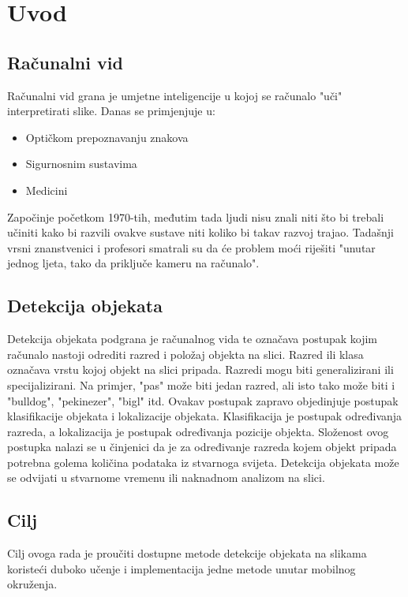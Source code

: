 \chapter{Uvod}
\section{Računalni vid}
Računalni vid grana je umjetne inteligencije u kojoj se računalo "uči" interpretirati slike. 
Danas se primjenjuje u:
\begin{itemize}
    \item Optičkom prepoznavanju znakova
    \item Sigurnosnim sustavima
    \item Medicini
\end{itemize}
Započinje početkom 1970-tih, međutim tada ljudi nisu znali niti što bi trebali učiniti kako bi razvili ovakve sustave niti koliko
bi takav razvoj trajao. Tadašnji vrsni znanstvenici i profesori smatrali su da će problem moći riješiti "unutar jednog ljeta, tako da priključe kameru na računalo". \citep{szeliski2010computer}

\section{Detekcija objekata}
Detekcija objekata podgrana je računalnog vida te označava postupak kojim računalo nastoji odrediti razred
i položaj objekta na slici. Razred ili klasa  označava vrstu kojoj objekt na slici pripada. Razredi mogu biti generalizirani ili specijalizirani. 
Na primjer, "pas" može biti jedan razred, ali isto tako može biti i "bulldog", "pekinezer", "bigl" itd.
Ovakav postupak zapravo objedinjuje postupak klasifikacije objekata i lokalizacije objekata. 
Klasifikacija je postupak određivanja razreda, a lokalizacija je postupak određivanja pozicije objekta.
Složenost ovog postupka nalazi se u činjenici da je za određivanje razreda kojem objekt pripada potrebna golema količina podataka 
iz stvarnoga svijeta. Detekcija objekata može se odvijati u stvarnome vremenu   ili naknadnom analizom na slici.


\section{Cilj}
Cilj ovoga rada je proučiti dostupne metode detekcije objekata na slikama koristeći duboko učenje i implementacija jedne metode unutar mobilnog okruženja. 
 
